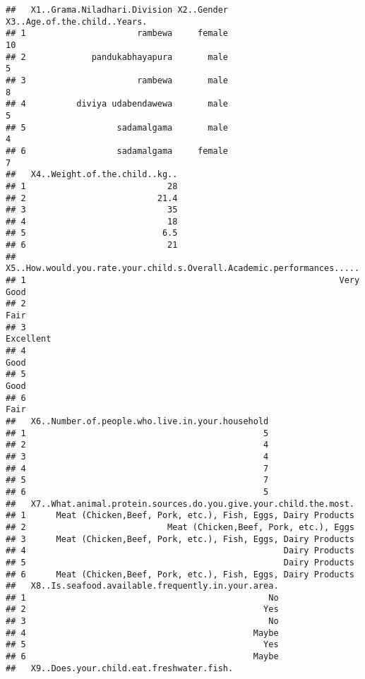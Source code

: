 \documentclass[
]{article}
\begin{document}
\begin{verbatim}
##   X1..Grama.Niladhari.Division X2..Gender X3..Age.of.the.child..Years.
## 1                      rambewa     female                           10
## 2             pandukabhayapura       male                            5
## 3                      rambewa       male                            8
## 4          diviya udabendawewa       male                            5
## 5                  sadamalgama       male                            4
## 6                  sadamalgama     female                            7
##   X4..Weight.of.the.child..kg..
## 1                            28
## 2                          21.4
## 3                            35
## 4                            18
## 5                           6.5
## 6                            21
##   X5..How.would.you.rate.your.child.s.Overall.Academic.performances.....
## 1                                                              Very Good
## 2                                                                   Fair
## 3                                                              Excellent
## 4                                                                   Good
## 5                                                                   Good
## 6                                                                   Fair
##   X6..Number.of.people.who.live.in.your.household
## 1                                               5
## 2                                               4
## 3                                               4
## 4                                               7
## 5                                               7
## 6                                               5
##   X7..What.animal.protein.sources.do.you.give.your.child.the.most.
## 1      Meat (Chicken,Beef, Pork, etc.), Fish, Eggs, Dairy Products
## 2                            Meat (Chicken,Beef, Pork, etc.), Eggs
## 3      Meat (Chicken,Beef, Pork, etc.), Fish, Eggs, Dairy Products
## 4                                                   Dairy Products
## 5                                                   Dairy Products
## 6      Meat (Chicken,Beef, Pork, etc.), Fish, Eggs, Dairy Products
##   X8..Is.seafood.available.frequently.in.your.area.
## 1                                                No
## 2                                               Yes
## 3                                                No
## 4                                             Maybe
## 5                                               Yes
## 6                                             Maybe
##   X9..Does.your.child.eat.freshwater.fish.

\end{verbatim}
\end{document}
